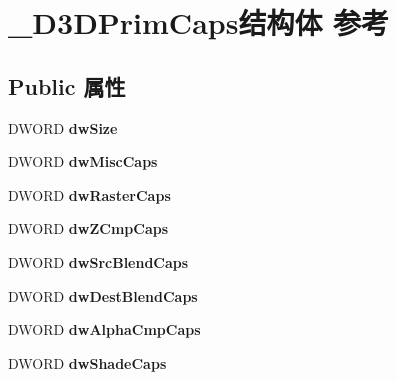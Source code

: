\hypertarget{struct___d3_d_prim_caps}{}\section{\+\_\+\+D3\+D\+Prim\+Caps结构体 参考}
\label{struct___d3_d_prim_caps}
\subsection*{Public 属性}
\begin{DoxyCompactItemize}
\item 
\mbox{\label{struct___d3_d_prim_caps_a7e2951dd6e616bb0cdfdc51f6b7b7d99}} 
D\+W\+O\+RD {\bfseries dw\+Size}
\item 
\mbox{\label{struct___d3_d_prim_caps_a16c4b0f652ba497e45f6161e69ec3a74}} 
D\+W\+O\+RD {\bfseries dw\+Misc\+Caps}
\item 
\mbox{\label{struct___d3_d_prim_caps_a45ec8252a7f0a035eb0ec94f5573c3ed}} 
D\+W\+O\+RD {\bfseries dw\+Raster\+Caps}
\item 
\mbox{\label{struct___d3_d_prim_caps_a14f4f8eae08e5d3b33949624639457d3}} 
D\+W\+O\+RD {\bfseries dw\+Z\+Cmp\+Caps}
\item 
\mbox{\label{struct___d3_d_prim_caps_ae89066c99e02b2d948f04870655dc275}} 
D\+W\+O\+RD {\bfseries dw\+Src\+Blend\+Caps}
\item 
\mbox{\label{struct___d3_d_prim_caps_a1959ccc796ff5b7829ed992b2760825a}} 
D\+W\+O\+RD {\bfseries dw\+Dest\+Blend\+Caps}
\item 
\mbox{\label{struct___d3_d_prim_caps_a350a62d3873c110859b26bc2ce72393e}} 
D\+W\+O\+RD {\bfseries dw\+Alpha\+Cmp\+Caps}
\item 
\mbox{\label{struct___d3_d_prim_caps_a6cab365376d9286bf7f3c00e2cf54058}} 
D\+W\+O\+RD {\bfseries dw\+Shade\+Caps}
\item 
\mbox{\label{struct___d3_d_prim_caps_aed4b189a97c187b5c98a30c10aa64d39}} 

\end{DoxyCompactItemize}
